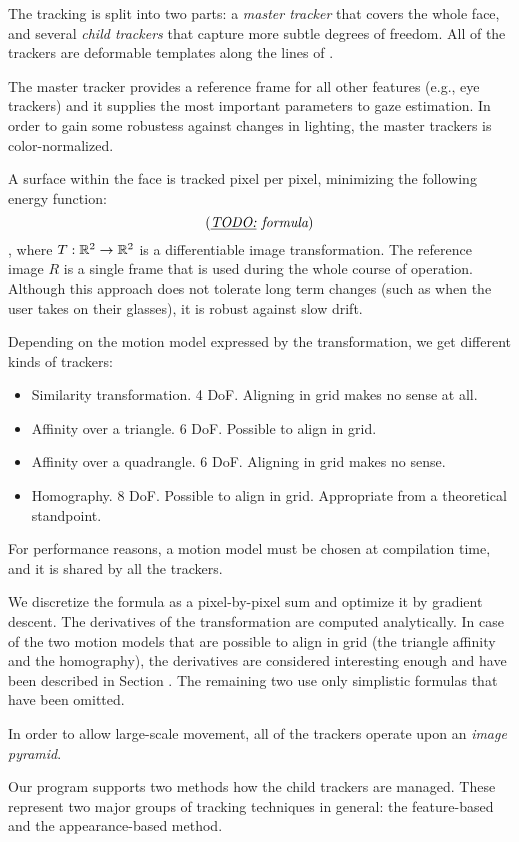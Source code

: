 The tracking is split into two parts: a \textit{master tracker} that covers the whole face, and several \textit{child trackers} that capture more subtle degrees of freedom.
All of the trackers are deformable templates along the lines of .

The master tracker provides a reference frame for all other features (e.g., eye trackers) and it supplies the most important parameters to gaze estimation.
In order to gain some robustess against changes in lighting, the master trackers is color-normalized.

A surface within the face is tracked pixel per pixel, minimizing the following energy function:
$$(\textit{\underline{TODO:} formula})$$,
where $T: \mathbb{R}^2 \to \mathbb{R}^2$ is a differentiable image transformation.
The reference image $R$ is a single frame that is used during the whole course of operation.
Although this approach does not tolerate long term changes (such as when the user takes on their glasses), it is robust against slow drift.

Depending on the motion model expressed by the transformation, we get different kinds of trackers:
\begin{itemize}
\item Similarity transformation. 4 DoF. Aligning in grid makes no sense at all.
\item Affinity over a triangle. 6 DoF. Possible to align in grid.
\item Affinity over a quadrangle. 6 DoF. Aligning in grid makes no sense.
\item Homography. 8 DoF. Possible to align in grid. Appropriate from a theoretical standpoint.
\end{itemize}
For performance reasons, a motion model must be chosen at compilation time, and it is shared by all the trackers.

We discretize the formula as a pixel-by-pixel sum and optimize it by gradient descent.
The derivatives of the transformation are computed analytically.
In case of the two motion models that are possible to align in grid (the triangle affinity and the homography), the derivatives are considered interesting enough and have been described in Section .
The remaining two use only simplistic formulas that have been omitted.

In order to allow large-scale movement, all of the trackers operate upon an \textit{image pyramid}.

Our program supports two methods how the child trackers are managed.
These represent two major groups of tracking techniques in general: the feature-based and the appearance-based method.

